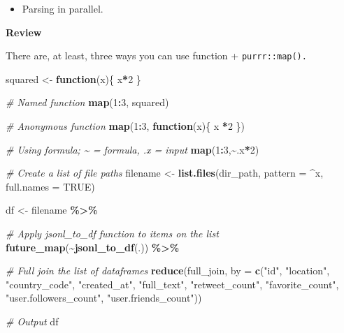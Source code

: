 \documentclass[
]{book}
\newenvironment{Shaded}{\begin{snugshade}}{\end{snugshade}}
\newcommand{\CommentTok}[1]{\textcolor[rgb]{0.56,0.35,0.01}{\textit{#1}}}
\newcommand{\ControlFlowTok}[1]{\textcolor[rgb]{0.13,0.29,0.53}{\textbf{#1}}}
\newcommand{\DataTypeTok}[1]{\textcolor[rgb]{0.13,0.29,0.53}{#1}}
\newcommand{\DecValTok}[1]{\textcolor[rgb]{0.00,0.00,0.81}{#1}}
\newcommand{\KeywordTok}[1]{\textcolor[rgb]{0.13,0.29,0.53}{\textbf{#1}}}
\newcommand{\NormalTok}[1]{#1}
\newcommand{\OperatorTok}[1]{\textcolor[rgb]{0.81,0.36,0.00}{\textbf{#1}}}
\newcommand{\OtherTok}[1]{\textcolor[rgb]{0.56,0.35,0.01}{#1}}
\newcommand{\StringTok}[1]{\textcolor[rgb]{0.31,0.60,0.02}{#1}}
\providecommand{\tightlist}{%
  \setlength{\itemsep}{0pt}\setlength{\parskip}{0pt}}
\begin{document}
\begin{itemize}
\tightlist
\item
  Parsing in parallel.
\end{itemize}

\textbf{Review}

There are, at least, three ways you can use function + \texttt{purrr::map().}

\begin{Shaded}
\begin{Highlighting}[]
\NormalTok{squared \textless{}{-}}\StringTok{ }\ControlFlowTok{function}\NormalTok{(x)\{}
\NormalTok{  x}\OperatorTok{*}\DecValTok{2} 
\NormalTok{\}}

\CommentTok{\# Named function }
\KeywordTok{map}\NormalTok{(}\DecValTok{1}\OperatorTok{:}\DecValTok{3}\NormalTok{, squared)}

\CommentTok{\# Anonymous function }
\KeywordTok{map}\NormalTok{(}\DecValTok{1}\OperatorTok{:}\DecValTok{3}\NormalTok{, }\ControlFlowTok{function}\NormalTok{(x)\{ x }\OperatorTok{*}\DecValTok{2}\NormalTok{ \})}

\CommentTok{\# Using formula; \textasciitilde{} = formula, .x = input }
\KeywordTok{map}\NormalTok{(}\DecValTok{1}\OperatorTok{:}\DecValTok{3}\NormalTok{,}\OperatorTok{\textasciitilde{}}\NormalTok{.x}\OperatorTok{*}\DecValTok{2}\NormalTok{)}
\end{Highlighting}
\end{Shaded}

\begin{Shaded}
\begin{Highlighting}[]
\CommentTok{\# Create a list of file paths }
\NormalTok{filename \textless{}{-}}\StringTok{ }\KeywordTok{list.files}\NormalTok{(dir\_path,}
          \DataTypeTok{pattern =} \StringTok{\textquotesingle{}\^{}x\textquotesingle{}}\NormalTok{,}
          \DataTypeTok{full.names =} \OtherTok{TRUE}\NormalTok{)}

\NormalTok{df \textless{}{-}}\StringTok{ }\NormalTok{filename }\OperatorTok{\%\textgreater{}\%}

\CommentTok{\# Apply jsonl\_to\_df function to items on the list}
\KeywordTok{future\_map}\NormalTok{(}\OperatorTok{\textasciitilde{}}\KeywordTok{jsonl\_to\_df}\NormalTok{(.)) }\OperatorTok{\%\textgreater{}\%}

\CommentTok{\# Full join the list of dataframes}
\KeywordTok{reduce}\NormalTok{(full\_join,}
       \DataTypeTok{by =} \KeywordTok{c}\NormalTok{(}\StringTok{"id"}\NormalTok{,}
              \StringTok{"location"}\NormalTok{,}
              \StringTok{"country\_code"}\NormalTok{,}
              \StringTok{"created\_at"}\NormalTok{,}
              \StringTok{"full\_text"}\NormalTok{,}
              \StringTok{"retweet\_count"}\NormalTok{,}
              \StringTok{"favorite\_count"}\NormalTok{,}
              \StringTok{"user.followers\_count"}\NormalTok{,}
              \StringTok{"user.friends\_count"}\NormalTok{))}

\CommentTok{\# Output}
\NormalTok{df}
\end{Highlighting}
\end{Shaded}
\end{document}
